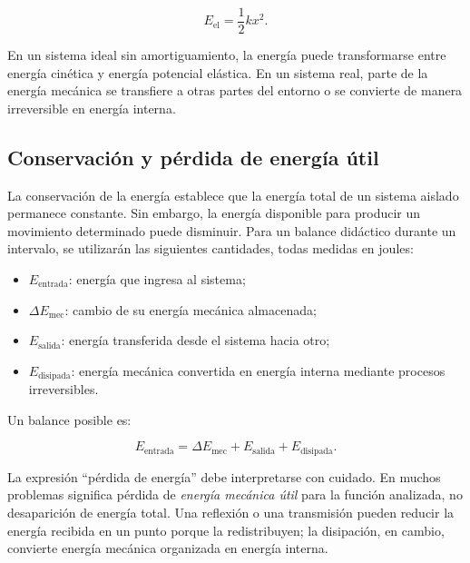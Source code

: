 \begin{equation}
    E_\mathrm{el}=\frac{1}{2}kx^{2}.
    \label{eq:u2-energia-elastica}
\end{equation}

En un sistema ideal sin amortiguamiento, la energía puede transformarse entre energía cinética y energía potencial elástica. En un sistema real, parte de la energía mecánica se transfiere a otras partes del entorno o se convierte de manera irreversible en energía interna.

\subsection{Conservación y pérdida de energía útil}
\label{sec:u2-conservacion-disipacion}

La conservación de la energía establece que la energía total de un sistema aislado permanece constante. Sin embargo, la energía disponible para producir un movimiento determinado puede disminuir. Para un balance didáctico durante un intervalo, se utilizarán las siguientes cantidades, todas medidas en joules:

\begin{itemize}
    \item \(E_\mathrm{entrada}\): energía que ingresa al sistema;
    \item \(\Delta E_\mathrm{mec}\): cambio de su energía mecánica almacenada;
    \item \(E_\mathrm{salida}\): energía transferida desde el sistema hacia otro;
    \item \(E_\mathrm{disipada}\): energía mecánica convertida en energía interna mediante procesos irreversibles.
\end{itemize}

Un balance posible es:

\begin{equation}
    E_\mathrm{entrada}
    =\Delta E_\mathrm{mec}
    +E_\mathrm{salida}
    +E_\mathrm{disipada}.
    \label{eq:u2-balance-energia}
\end{equation}

La expresión ``pérdida de energía'' debe interpretarse con cuidado. En muchos problemas significa pérdida de \emph{energía mecánica útil} para la función analizada, no desaparición de energía total. Una reflexión o una transmisión pueden reducir la energía recibida en un punto porque la redistribuyen; la disipación, en cambio, convierte energía mecánica organizada en energía interna.

